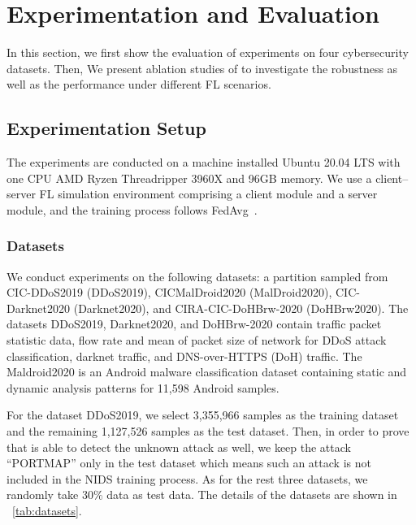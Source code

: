 

\section{Experimentation and Evaluation}
\label{sec:experiments}

In this section, we first show the evaluation of experiments on four cybersecurity datasets.
Then, We present ablation studies of \Fname to investigate the robustness as well as the performance under different FL scenarios.

\subsection{Experimentation Setup}

The experiments are conducted on a machine installed Ubuntu 20.04 LTS with one CPU AMD Ryzen Threadripper 3960X and 96GB memory.
We use a client--server FL simulation environment comprising a client module and a server module, and the training process follows FedAvg~\cite{federated_learning}.

\subsubsection{Datasets}
We conduct experiments on the following datasets: a partition sampled from CIC-DDoS2019\cite{cicddos19} (DDoS2019), CICMalDroid2020\cite{maldroid} (MalDroid2020), CIC-Darknet2020\cite{darknet} (Darknet2020), and CIRA-CIC-DoHBrw-2020\cite{DoH} (DoHBrw2020).
The datasets DDoS2019, Darknet2020, and DoHBrw-2020 contain traffic packet statistic data, \eg flow rate and mean of packet size \etc of network for DDoS attack classification, darknet traffic, and DNS-over-HTTPS (DoH) traffic.
The Maldroid2020 is an Android malware classification dataset containing static and dynamic analysis patterns for 11,598 Android samples.

For the dataset DDoS2019, we select 3,355,966 samples as the training dataset and the remaining 1,127,526 samples as the test dataset.
Then, in order to prove that \Fname is able to detect the unknown attack as well, we keep the attack ``PORTMAP'' only in the test dataset which means such an attack is not included in the NIDS training process.
As for the rest three datasets, we randomly take $30\%$ data as test data. The details of the datasets are shown in \tablename~\ref{tab:datasets}.


